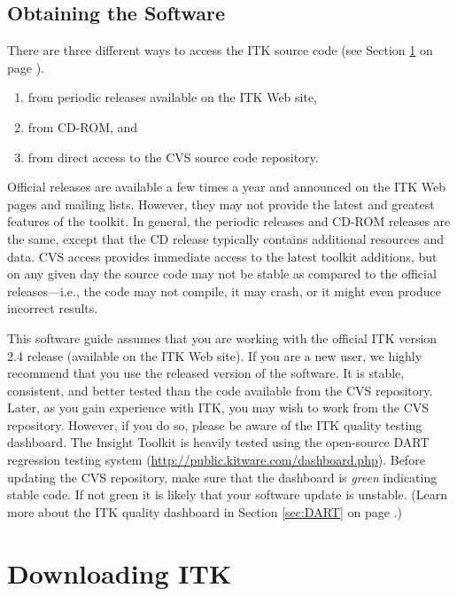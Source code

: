 \subsection{Obtaining the Software}
\label{sec:ObtainingTheSoftware}

There are three different ways to access the ITK source code
(see Section \ref{sec:DownloadingITK} on page \pageref{sec:DownloadingITK}).
\begin{enumerate}
	\item	from periodic releases available on the ITK Web site,
	\item	from CD-ROM, and
	\item	from direct access to the CVS source code repository.
\end{enumerate}
Official releases are available a few times a year and announced on the ITK
Web pages and mailing lists. However, they may not provide the latest and
greatest features of the toolkit. In general, the periodic releases and
CD-ROM releases are the same, except that the CD release typically contains
additional resources and data. CVS access provides immediate access to the
latest toolkit additions, but on any given day the source code may not be
stable as compared to the official releases---i.e., the code may not compile,
it may crash, or it might even produce incorrect results.

This software guide assumes that you are working with the official ITK
version 2.4 release (available on the ITK Web site). If you are a new user,
we highly recommend that you use the released version of the software. It is
stable, consistent, and better tested than the code available from the CVS
repository. Later, as you gain experience with ITK, you may wish to work from
the CVS repository. However, if you do so, please be aware of the ITK quality
testing dashboard. The Insight Toolkit is heavily tested using the
open-source DART regression testing system
(\url{http://public.kitware.com/dashboard.php}). Before updating the CVS
repository, make sure that the dashboard is \emph{green} indicating stable
code. If not green it is likely that your software update is unstable. (Learn
more about the ITK quality dashboard in Section
\ref{sec:DART} on page \pageref{sec:DART}.)

\section{Downloading ITK}
\label{sec:DownloadingITK}
 

